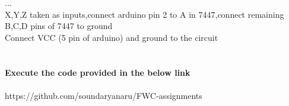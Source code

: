\documentclass{article}
\begin{document}
...\\
X,Y,Z taken as inputs,connect arduino pin 2 to A in 7447,connect remaining B,C,D pins of 7447 to ground\\
Connect VCC (5 pin of arduino) and ground to the circuit
\\
\\
\\
\textbf{Execute the code provided in the below link}
\\
\\
https://github.com/soundaryanaru/FWC-assignments
\end{document}
